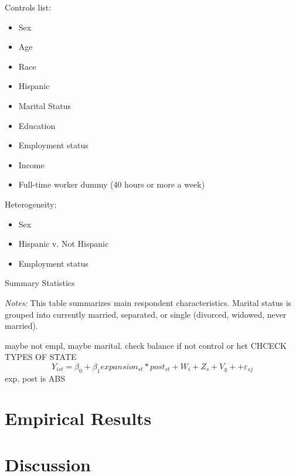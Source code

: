 \documentclass{article}
\begin{document}
Controls list:
\begin{itemize}
    \item Sex
    \item Age
    \item Race
    \item Hispanic
    \item Marital Status
    \item Education
    \item Employment status
    \item Income
    \item Full-time worker dummy (40 hours or more a week)
\end{itemize}

Heterogeneity:
\begin{itemize}
    \item Sex
    \item Hispanic v. Not Hispanic
    \item Employment status
\end{itemize}




\begin{table}[h!]
\begin{centering}
\singlespacing
\caption{Summary Statistics}
\label{tab:sumstat}
\end{centering}
\begin{spacing}{1}
\begin{footnotesize}

\textit{Notes:} This table summarizes main respondent characteristics. Marital status is grouped into currently married, separated, or single (divorced, widowed, never married).
\end{footnotesize}
\end{spacing}
\end{table}

maybe not empl, maybe marital. check balance if not control or het
CHCECK TYPES OF STATE 
\begin{equation}
    Y_{ist} = \beta_0 + \beta_1 expansion_{st}*post_{st} +  W_{i} + Z_{s} + V_{y}+ + \varepsilon_{sj}
\end{equation}
exp, post is ABS 

\section{Empirical Results}


\section{Discussion}
\end{document}
